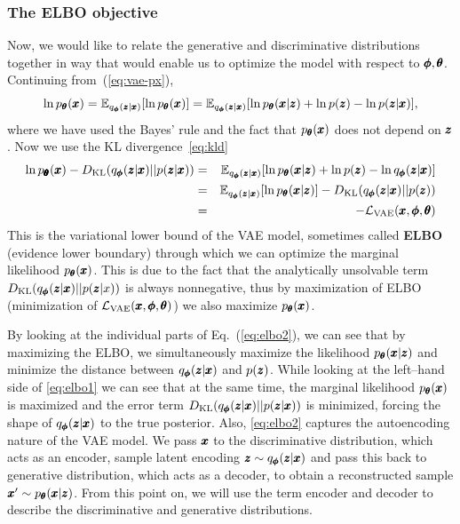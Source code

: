 \subsubsection{The ELBO objective}
Now, we would like to relate the generative and discriminative distributions together in way that would enable us to optimize the model with respect to $\pmb{{\phi}},\pmb{{\theta}}$. Continuing from~(\ref{eq:vae-px}),
\begin{equation}
\ln p_{\vc{\theta}}(\vc{x})=\mathbb{E}_{q_{\vc{\phi}}(\vc{z}|\vc{x})}\left[\ln p_{\vc{\theta}}(\vc{x})\right]=\mathbb{E}_{q_{\vc{\phi}}(\vc{z}|\vc{x})}\left[\ln p_{\vc{\theta}}(\vc{x}|\vc{z})+\ln p(\vc{z})-\ln p(\vc{z}|\vc{x})\right],
\end{equation}
where we have used the Bayes' rule and the fact that $p_{\pmb{{\theta}}}(\pmb{{x}})$ does not depend on $\pmb{{z}}$. Now we use the KL divergence~\eqref{eq:kld}
\begin{eqnarray}
\ln p_{\vc{\vc{\theta}}}(\vc{x})-D_{\text{KL}}\left(q_{\vc{\phi}}(\vc{z}|\vc{x})||p(\vc{z}|\vc{x})\right) & = & \mathbb{E}_{q_{\vc{\phi}}(\vc{z}|\vc{x})}\left[\ln p_{\vc{\theta}}(\vc{x}|\vc{z})+\ln p(\vc{z})-\ln q_{\vc{\phi}}(\vc{z}|\vc{x})\right]\label{eq:elbo1}\\
 & = & \mathbb{E}_{q_{\vc{\phi}}(\vc{z}|\vc{x})}\left[\ln p_{\vc{\theta}}(\vc{x}|\vc{z})\right]-D_{\text{KL}}\left(q_{\vc{\phi}}(\vc{z}|\vc{x})||p(\vc{z})\right)\label{eq:elbo2}\\
 & = & - \mathcal{L}_{\text{VAE}}(\vc{x},\vc{\phi},\vc{\theta})\label{eq:elbo3}
\end{eqnarray}
This is the variational lower bound of the VAE model, sometimes called \textbf{ELBO} (evidence lower boundary) through which we can optimize the marginal likelihood $p_{\pmb{{\theta}}}(\pmb{{x}})$. This is due to the fact that the analytically unsolvable term $D_{\text{KL}}\left(q_{\vc{\phi}}(\vc{z}|\vc{x})||p(\vc{z}|x)\right)$ is always nonnegative, thus by maximization of ELBO (minimization of $\mathcal{L}_{\text{VAE}}(\pmb{{x}},\pmb{{\phi}},\pmb{{\theta}})$) we also maximize $p_{\pmb{{\theta}}}(\pmb{{x}})$.

By looking at the individual parts of Eq.~(\ref{eq:elbo2}), we can see that by maximizing the ELBO, we simultaneously maximize the likelihood $p_{\pmb{{\theta}}}(\pmb{{x}}|\pmb{{z}})$ and minimize the distance between $q_{\pmb{{\phi}}}(\pmb{{z}}|\pmb{{x}})$ and $p(\pmb{{z}})$. While looking at the left--hand side of \eqref{eq:elbo1} we can see that at the same time, the marginal likelihood $p_{\pmb{{\theta}}}(\pmb{{x}})$ is maximized and the error term $D_{\text{KL}}\left(q_{\vc{\phi}}(\vc{z}|\vc{x})||p(\vc{z}|\vc{x})\right)$ is minimized, forcing the shape of $q_{\pmb{{\phi}}}(\pmb{{z}}|\pmb{{x}})$ to the true posterior. Also, \eqref{eq:elbo2} captures the autoencoding nature of the VAE model. We pass $\pmb{{x}}$ to the discriminative distribution, which acts as an encoder, sample latent encoding $\pmb{{z}} \sim q_{\pmb{{\phi}}}(\pmb{{z}}|\pmb{{x}})$ and pass this back to generative distribution, which acts as a decoder, to obtain a reconstructed sample $\pmb{{x}}' \sim p_{\pmb{{\theta}}}(\pmb{{x}}|\pmb{{z}})$. From this point on, we will use the term encoder and decoder to describe the discriminative and generative distributions.

